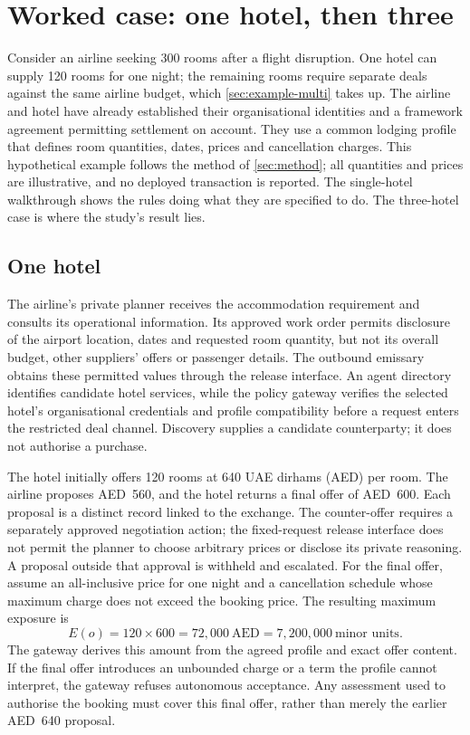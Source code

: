 \section{Worked case: one hotel, then three}
\label{sec:example}

Consider an airline seeking 300 rooms after a flight disruption. One hotel can supply 120 rooms for one night; the remaining rooms require separate deals against the same airline budget, which \cref{sec:example-multi} takes up. The airline and hotel have already established their organisational identities and a framework agreement permitting settlement on account. They use a common lodging profile that defines room quantities, dates, prices and cancellation charges. This hypothetical example follows the method of \cref{sec:method}; all quantities and prices are illustrative, and no deployed transaction is reported. The single-hotel walkthrough shows the rules doing what they are specified to do. The three-hotel case is where the study's result lies.

\subsection{One hotel}
\label{sec:example-single}

The airline's private planner receives the accommodation requirement and consults its operational information. Its approved work order permits disclosure of the airport location, dates and requested room quantity, but not its overall budget, other suppliers' offers or passenger details. The outbound emissary obtains these permitted values through the release interface. An agent directory identifies candidate hotel services, while the policy gateway verifies the selected hotel's organisational credentials and profile compatibility before a request enters the restricted deal channel. Discovery supplies a candidate counterparty; it does not authorise a purchase.

The hotel initially offers 120 rooms at 640 UAE dirhams (AED) per room. The airline proposes AED~560, and the hotel returns a final offer of AED~600. Each proposal is a distinct record linked to the exchange. The counter-offer requires a separately approved negotiation action; the fixed-request release interface does not permit the planner to choose arbitrary prices or disclose its private reasoning. A proposal outside that approval is withheld and escalated. For the final offer, assume an all-inclusive price for one night and a cancellation schedule whose maximum charge does not exceed the booking price. The resulting maximum exposure is
\begin{equation}
E(o)=120\times 600=72{,}000\ \mathrm{AED}
      =7{,}200{,}000\ \text{minor units}.
\label{eq:example-exposure}
\end{equation}
The gateway derives this amount from the agreed profile and exact offer content. If the final offer introduces an unbounded charge or a term the profile cannot interpret, the gateway refuses autonomous acceptance. Any assessment used to authorise the booking must cover this final offer, rather than merely the earlier AED~640 proposal.


